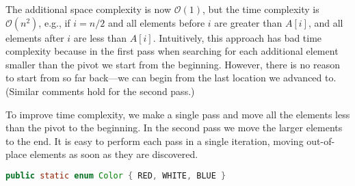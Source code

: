 \documentclass[10pt,openany,twoside,letterpaper,extrafontsizes]{memoir}
\newif\ifCpp
\newif\ifJava
\begin{document}
\begin{Spacing}{\arraysSpacing}
The additional space complexity is now $\mathcal{O}(1)$, but the time complexity is $\mathcal{O}(n^2)$, e.g., if $i = n/2$ and all elements before $i$ are greater than $A[i]$, and all elements after $i$ are less than $A[i]$.
Intuitively, this approach has bad time complexity because in the first pass when searching for each additional element smaller than the pivot we start from the beginning.
However, there is no reason to start from so far back---we can begin from the last location we advanced to.
(Similar comments hold for the second pass.)

To improve time complexity, we make a single pass and move all the elements less than the pivot to the beginning.
In the second pass we move the larger elements to the end.
It is easy to perform each pass in a single iteration, moving out-of-place elements as soon as they are discovered.
\ifCpp
\begin{lstlisting}[language={[11]C++}]
typedef enum { RED, WHITE, BLUE } Color;

void DutchFlagPartition(int pivot_index, vector<Color>* A_ptr) {
  vector<Color>& A = *A_ptr;
  Color pivot = A[pivot_index];
  // First pass: group elements smaller than pivot.
  int smaller = 0;
  for (int i = 0; i < A.size(); ++i) {
    if (A[i] < pivot) {
      swap(A[i], A[smaller++]);
    }
  }
  // Second pass: group elements larger than pivot.
  int larger = A.size() - 1;
  for (int i = A.size() - 1; i >= 0 && A[i] >= pivot; --i) {
    if (A[i] > pivot) {
      swap(A[i], A[larger--]);
    }
  }
}
\end{lstlisting}
\fi%
\ifJava
\begin{lstlisting}[language=Java]
public static enum Color { RED, WHITE, BLUE }


\end{lstlisting}
\end{Spacing}
\end{document}
